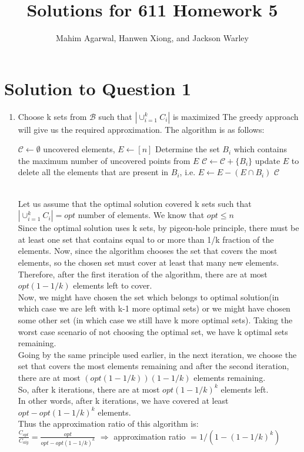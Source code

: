 \documentclass[11pt]{article}
\title{Solutions for 611 Homework 5}
\author{Mahim Agarwal, Hanwen Xiong, and Jackson Warley}
\begin{document}
\maketitle

\section{Solution to Question 1}

\begin{enumerate}
    \item Choose k sets from $\mathcal{B}$ such that $|{\cup_{i=1}^k C_i}|$ is maximized \newline
    The greedy approach will give us the required approximation. The algorithm is as follows:
    \begin{algorithm}
  \begin{algorithmic}
      \State $\mathcal{C} \leftarrow \emptyset$
      \State uncovered elements, $E \leftarrow [n]$
          \State Determine the set $B_i$ which contains the maximum number of uncovered points from $E$
          \State $\mathcal{C} \leftarrow \mathcal{C} + \{B_i\}$
          \State update $E$ to delete all the elements that are present in $B_i$, i.e. $E \leftarrow E - (E \cap B_i)$
      \EndWhile
      \State \Return $\mathcal{C}$
    \EndFunction
  \end{algorithmic}
\end{algorithm}\\
Let us assume that the optimal solution covered k sets such that $|{\cup_{i=1}^k C_i}| = opt $ number of elements. We know that $opt \leq n$ \\
Since the optimal solution uses k sets, by pigeon-hole principle, there must be at least one set that contains equal to or more than 1/k 
fraction of the elements. Now, since the algorithm chooses the set that covers the most elements, so the chosen set must cover at least 
that many new elements. Therefore, after the first iteration of the algorithm, there are at most $opt(1 - 1/k)$ elements left to cover. \\
Now, we might have chosen the set which belongs to optimal solution(in which case we are left with k-1 more optimal sets) or we might 
have chosen some other set (in which case we still have k more optimal sets). Taking the worst case scenario of not choosing the optimal 
set, we have k optimal sets remaining.\\
Going by the same principle used earlier, in the next iteration, we choose the set that covers the most elements remaining and after the 
second iteration, there are at most $(opt(1 - 1/k))(1 - 1/k)$ elements remaining. \\
So, after k iterations, there are at most $opt(1 - 1/k)^k$ elements left. \\
In other words, after k iterations, we have covered at least $opt - opt(1 - 1/k)^k$ elements. \\
Thus the approximation ratio of this algorithm is: \\
$\frac{C_{opt}}{C_{alg}} = \frac{opt}{opt - opt(1- 1/k)^k} $
$\Longrightarrow$ approximation ratio $= 1/(1 - (1 - 1/k)^k)$


\end{enumerate}
\end{document}
